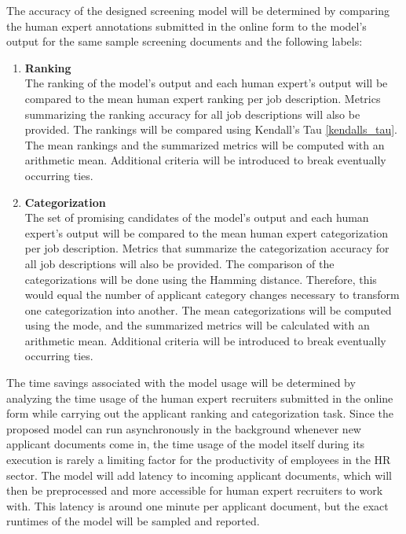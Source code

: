 \documentclass[draft,final]{thesisclass} %
\begin{document}
The accuracy of the designed screening model will be determined by comparing the human expert annotations submitted in the online form to the model's output for the same sample screening documents and the following labels:
\begin{enumerate}
    \item \textbf{Ranking}\\
    The ranking of the model's output and each human expert's output will be compared to the mean human expert ranking per job description.
    Metrics summarizing the ranking accuracy for all job descriptions will also be provided.
    The rankings will be compared using Kendall's Tau \ref{kendalls_tau}.
    The mean rankings and the summarized metrics will be computed with an arithmetic mean.
    Additional criteria will be introduced to break eventually occurring ties.
    \item \textbf{Categorization}\\
    The set of promising candidates of the model's output and each human expert's output will be compared to the mean human expert categorization per job description.
    Metrics that summarize the categorization accuracy for all job descriptions will also be provided.
    The comparison of the categorizations will be done using the Hamming distance.
    Therefore, this would equal the number of applicant category changes necessary to transform one categorization into another.
    The mean categorizations will be computed using the mode, and the summarized metrics will be calculated with an arithmetic mean.
    Additional criteria will be introduced to break eventually occurring ties.
\end{enumerate}

The time savings associated with the model usage will be determined by analyzing the time usage of the human expert recruiters submitted in the online form while carrying out the applicant ranking and categorization task.
Since the proposed model can run asynchronously in the background whenever new applicant documents come in, the time usage of the model itself during its execution is rarely a limiting factor for the productivity of employees in the \acs{HR} sector.
The model will add latency to incoming applicant documents, which will then be preprocessed and more accessible for human expert recruiters to work with.
This latency is around one minute per applicant document, but the exact runtimes of the model will be sampled and reported.
\end{document}
